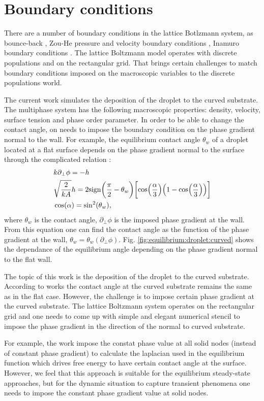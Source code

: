 \documentclass{article}
\newcommand{\beqal}{\begin{equation}\begin{aligned}}
\newcommand{\feqal}{\end{aligned}\end{equation}}
\begin{document}
\section{Boundary conditions}
There are a number of boundary conditions in the lattice Botlzmann system, as bounce-back \cite{yu}, Zou-He pressure and velocity boundary conditions \cite{zouhe-boundary}, Inamuro boundary conditions \cite{inamuro-scalar-boundary}. The lattice Boltzmann model operates with discrete populations and on the rectangular grid. That brings certain challenges to match boundary conditions imposed on the macroscopic variables to the discrete populations world.

The current work simulates the deposition of the droplet to the curved substrate. The multiphase system has the following macroscopic properties: density, velocity, surface tension and phase order parameter.  In order to be able to change the contact angle, on needs to impose the boundary condition on the phase gradient normal to the wall. For example, the equilibrium contact angle $\theta_{w}$ of a droplet located at a flat surface depends on the phase gradient normal to the surface through the complicated relation \cite{briant-contact-line}:
\beqal
&k \partial_{\perp} \phi = -h\\
&\sqrt{\frac{2}{k A}}h= 2 \mathrm{sign}\biggl(\frac{\pi}{2}-\theta_w\biggr) \biggl[\cos\Bigl(\frac{\alpha}{3}\Bigr)\Bigl(1-\cos\Bigl(\frac{\alpha}{3}\Bigr)\Bigr)\biggr]\\
&\cos(\alpha)=\sin^2(\theta_w),
\feqal
where $\theta_w$ is the contact angle, $\partial_{\perp}\phi$ is the imposed phase gradient at the wall. From this equation one can find the contact angle as the function of the phase gradient at the wall, $\theta_w=\theta_w(\partial_{\perp}\phi)$. Fig.  \ref{fig:equilibrium:droplet:curved} shows the dependance of the equilibrium angle depending on the phase gradient normal to the flat wall. 

The topic of this work is the deposition of the droplet to the curved substrate.  According to works \cite{manukyan-curved,carroll-curved} the contact angle at the curved substrate remains the same as in the flat case. However, the challenge is to impose certain phase gradient at the curved substrate. The lattice Boltzmann system operates on the rectangular grid and one needs to come up with simple and elegant numerical stencil to impose the phase gradient in the direction of the normal to curved substrate.  

For example, the work \cite{japan-curved} impose the constat phase value at all solid nodes (instead of constant phase gradient) to calculate the laplacian used in the equilibrium function which drives free energy to have certain contact angle at the surface. However, we feel that this approach is suitable for the equilibrium steady-state approaches, but for the dynamic situation to capture transient phenomena one needs to impose the constant phase gradient value at solid nodes.
\end{document}
